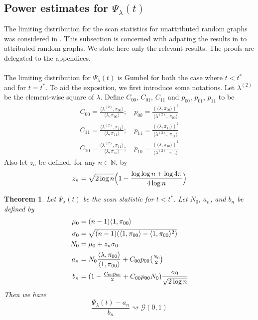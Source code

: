 \documentclass[draftcls]{IEEEtran}
\newtheorem{theorem}{Theorem}
\theoremstyle{definition}
\begin{document}
\subsection{Power estimates for $\Psi_{\lambda}(t)$}
The limiting distribution for the scan statistics for unattributed
random graphs was considered in
\cite{rukhin:_limit_distr_graph_scan_statis}. This subsection is
concerned with adpating the results in
\cite{rukhin:_limit_distr_graph_scan_statis} to attributed random
graphs. We state here only the relevant results. The proofs are
delegated to the appendices. \\ \\
\noindent
The limiting distribution for $\Psi_{\lambda}(t)$ is Gumbel for both
the case where $t < t^{*}$ and for $t = t^{*}$. To aid the exposition,
we first introduce some notations. Let $\lambda^{(2)}$ be the
element-wise square of $\lambda$. Define $C_{00}$, $C_{01}$, $C_{11}$
and $p_{00}$, $p_{01}$, $p_{11}$ to be
\begin{gather}
  \label{eq:19}
  C_{00} = \tfrac{\langle \lambda^{(2)}, \pi_{00} \rangle}{\langle \lambda,
    \pi_{00}\rangle}; \quad p_{00} = \tfrac{(\langle \lambda, \pi_{00}
    \rangle)^{2}}{\langle \lambda^{(2)},\, \pi_{00} \rangle} \\
C_{11} = \tfrac{\langle \lambda^{(2)}, \pi_{11} \rangle}{\langle \lambda,
    \pi_{11}\rangle}; \quad p_{11} = \tfrac{(\langle \lambda, \pi_{11}
    \rangle)^{2}}{\langle \lambda^{(2)},\, \pi_{11} \rangle} \\
C_{10} = \tfrac{\langle \lambda^{(2)}, \pi_{11} \rangle}{\langle \lambda,
    \pi_{10}\rangle}; \quad p_{10} = \tfrac{(\langle \lambda, \pi_{10}
    \rangle)^{2}}{\langle \lambda^{(2)},\, \pi_{10} \rangle} 
\end{gather}
Also let $z_n$ be defined, for any $n \in \mathbb{N}$, by
\begin{equation}
  \label{eq:20}
   z_n = \sqrt{2
      \log{n}}\Bigl(1 - \frac{\log{\log{n}} + \log{4 \pi}}{4
      \log{n}}\Bigr)
\end{equation}
\begin{theorem}
  \label{thm:2}
  Let $\Psi_{\lambda}(t)$ be the scan statistic for $t < t^{*}$. Let
  $N_{0}$, $a_n$, and $b_n$ be defined by
\begin{align*}
   \mu_0 &= (n-1) \langle 1, \pi_{00} \rangle \\
   \sigma_0 &= \sqrt{(n-1) (\langle 1, \pi_{00} \rangle - \langle
     1, \pi_{00} \rangle^2)} \\ 
    N_{0} &= \mu_0 + z_n \sigma_0 \\
    a_n &= N_{0} \frac{\langle \lambda, \pi_{00} \rangle}{\langle
      1, \pi_{00} \rangle} + C_{00}p_{00}\tbinom{N_{0}}{2} \\ 
   b_n &= (1 - \tfrac{C_{00}p_{00}}{2} + C_{00}p_{00} N_{0}) \frac{\sigma_0}{\sqrt{2 \log
     n}}
\end{align*}
Then we have
\begin{equation}
  \frac{\Psi_{\lambda}(t) - a_{n}}{b_n} \rightsquigarrow
  \mathcal{G}(0, 1)
\end{equation}
\end{theorem}%
\end{document}

